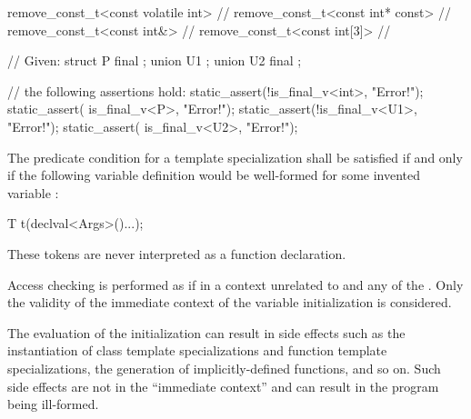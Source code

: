 \pnum
\begin{example}
\begin{codeblock}
remove_const_t<const volatile int>  // 
remove_const_t<const int* const>    // 
remove_const_t<const int&>          // 
remove_const_t<const int[3]>        // 
\end{codeblock}
\end{example}

\pnum
\begin{example}
\begin{codeblock}
// Given:
struct P final { };
union U1 { };
union U2 final { };

// the following assertions hold:
static_assert(!is_final_v<int>, "Error!");
static_assert( is_final_v<P>,  "Error!");
static_assert(!is_final_v<U1>, "Error!");
static_assert( is_final_v<U2>, "Error!");
\end{codeblock}
\end{example}

%
\pnum
The predicate condition for a template specialization
 shall be satisfied if and only if the
following variable definition would be well-formed for some invented variable :

\begin{codeblock}
T t(declval<Args>()...);
\end{codeblock}

\begin{note} These tokens are never interpreted as a function declaration.
\end{note} Access checking is performed as if in a context unrelated to 
and any of the . Only the validity of the immediate context of the
variable initialization is considered. \begin{note} The evaluation of the
initialization can result in side effects such as the instantiation of class
template specializations and function template specializations, the generation
of implicitly-defined functions, and so on. Such side effects are not in the
``immediate context'' and can result in the program being ill-formed. \end{note}

